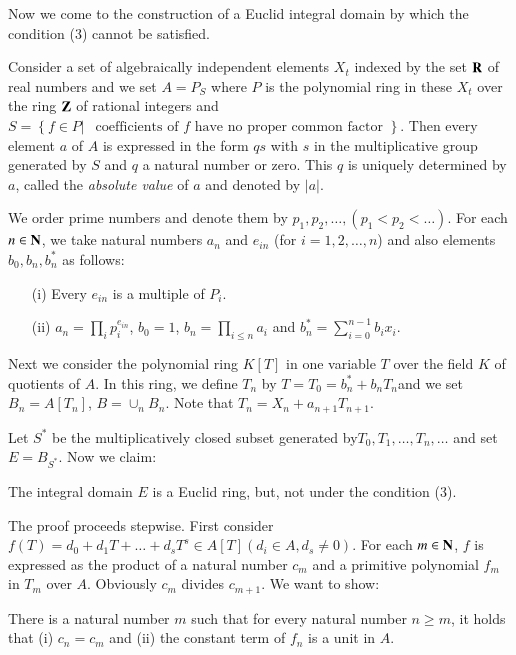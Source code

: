Now we come to the construction of a Euclid integral domain by which the condition (3) cannot be satisfied.

Consider a set of algebraically independent elements $X_t$ indexed by the set $\mathbf{R}$ of real numbers and we set $A = P_S$ where $P$ is the polynomial ring in these $X_t$ over the ring $\mathbf{Z}$ of rational integers and $S = \left\{f \in P| ~~\text{ coefficients of $f$ have no proper common factor } \right\}$. Then every element $a$ of $A$ is expressed in the form $qs$ with $s$ in the multiplicative group generated by $S$ and $q$ a natural number or zero. This $q$ is uniquely determined by $a$, called the {\em absolute value} of $a$ and denoted by $|a|$.

We order prime numbers and denote them by $p_1, p_2, \ldots, (p_1 <p_2 < \ldots)$. For each $n \in\mathbf{N}$, we take natural numbers $a_n$ and $e_{in}$ (for $i =1,2,\ldots,n$) and also elements $b_0, b_n, b^*_n$ as follows:
\begin{itemize}
\item[(i)] Every $e_{in}$ is a multiple of $P_i$.

\item[(ii)] $a_n = \prod\limits_i p_i^{e_{in}}$, $b_0 = 1$, $b_n = \prod\limits_{i \leqslant n}a_i$  and $b^*_n = \sum^{n-1}_{i=0} b_i x_i$.
\end{itemize}

Next we consider the polynomial ring $K[T]$ in one variable $T$ over the field $K$ of quotients of $A$. In this ring, we define $T_n$ by $T= T_0 = b^*_n + b_n T_n$\pageoriginale and we set $B_n = A [T_n]$, $B = \cup_n B_n$. Note that $T_n= X_n + a_{n+1} T_{n+1}$.

Let $S^*$ be the multiplicatively closed subset generated by\break $T_0, T_1, \ldots, T_n, \ldots$ and set $E=B_{S^*}$. Now we claim:

\begin{thm}\label{art16-thm2.3}
The integral domain $E$ is a Euclid ring, but, not under the condition (3).
\end{thm}

The proof proceeds stepwise. First consider $f(T) = d_0 + d_1 T + \ldots + d_s T^s \in A [T] (d_i \in A, d_s \neq 0)$. For each $m \in \mathbf{N}$, $f$ is expressed as the product of a natural number $c_m$ and a primitive polynomial $f_m$ in $T_m$ over $A$. Obviously $c_m$ divides $c_{m+1}$. We  want to show:

\begin{lemma}\label{art16-lem2.4}
There is a natural number $m$ such that for every natural number $n \geqslant m$, it holds that (i) $c_n = c_m$ and (ii) { the constant term of $f_n$ is a unit in $A$}.
\end{lemma}

